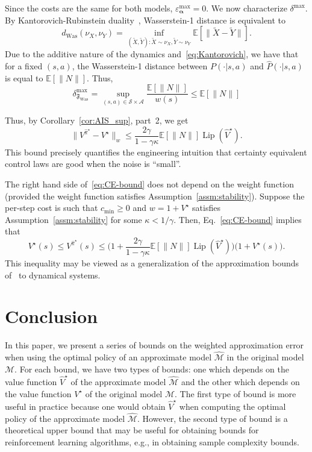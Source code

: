\documentclass[letterpaper, 10pt]{IEEEtran}
\newcommand*\ALPHABET{\mathcal}
\newcommand*\EXP{\mathds{E}}
\newcommand\F{\mathfrak{F}}
\newcommand\FWas{\F_{\mathrm{Was}}}
\newcommand\dWas{d_{\mathrm{Was}}}
\DeclareMathOperator{\Lip}{Lip}
\begin{document}
Since the costs are the same for both models, $\varepsilon_{\boldsymbol{\alpha}}^{\max} = 0$. We now characterize $\delta^{\max}$. 
By Kantorovich-Rubinstein duality~\cite{villani2009optimal}, Wasserstein-1 distance is equivalent to
\begin{equation}\label{eq:Kantorovich}
    \dWas(\nu_X, \nu_Y) = \inf_{(\tilde X, \tilde Y) \colon \tilde X \sim \nu_X, \tilde Y \sim \nu_Y }
    \EXP[ \| \tilde X - \tilde Y \| ].
\end{equation}
Due to the additive nature of the dynamics and~\eqref{eq:Kantorovich}, we have that for a fixed $(s,a)$, the Wasserstein-1 distance between $P(\cdot |s,a)$ and $\hat P(\cdot| s,a)$ is equal to $\EXP[\|N\|]$.
Thus, 
\[
    \delta^{\max}_{\FWas} = \sup_{(s,a) \in \ALPHABET S \times \ALPHABET A} \frac{ \EXP[ \| N \| ] }{ w(s) } \leq \EXP[ \| N \| ] 
\]

Thus, by Corollary~\ref{cor:AIS_sup}, part~2, we get
\begin{equation}\label{eq:CE-bound}
    \| V^{\hat \pi^\star} - V^\star \|_w \le \frac{2\gamma}{1- \gamma \kappa} \EXP[ \| N \| ] \Lip(\hat V^\star).
\end{equation}
This bound precisely quantifies the engineering intuition that certainty equivalent control laws are good when the noise is ``small''.

\begin{remark}
    The right hand side of~\eqref{eq:CE-bound} does not depend on the weight function (provided the weight function satisfies Assumption~\ref{assm:stability}). Suppose  the per-step cost is such that $c_{\min} \ge 0$ and $w = 1 + V^\star$ satisfies Assumption~\ref{assm:stability} for some $\kappa < 1/\gamma$. Then, Eq.~\eqref{eq:CE-bound} implies that 
    \[
        V^\star(s) \le V^{\hat \pi^\star}(s) \le 
        \biggl(1 + \frac{2\gamma}{1- \gamma \kappa} \EXP[ \| N \| ] \Lip(\hat V^\star) \biggr) \bigl(1 +V^\star(s)\bigr).
    \]
    This inequality may be viewed as a generalization of the approximation bounds of~\cite{Witsenhausen1969} to dynamical systems.
\end{remark}

\section{Conclusion}
  In this paper, we present a series of bounds on the weighted approximation error when using the optimal policy of an approximate model $\hat {\ALPHABET M}$ in the original model $\ALPHABET M$. For each bound, we have two types of bounds: one which depends on the value function $\hat V^\star$ of the approximate model $\hat {\ALPHABET M}$ and the other which depends on the value function $V^\star$ of the original model $\ALPHABET M$. The first type of bound is more useful in practice because one would obtain $\hat V^\star$ when computing the optimal policy of the approximate model $\hat {\ALPHABET M}$. However, the second type of bound is a theoretical upper bound that may be useful for obtaining bounds for reinforcement learning algorithms, e.g., in obtaining sample complexity bounds. 
\end{document}
